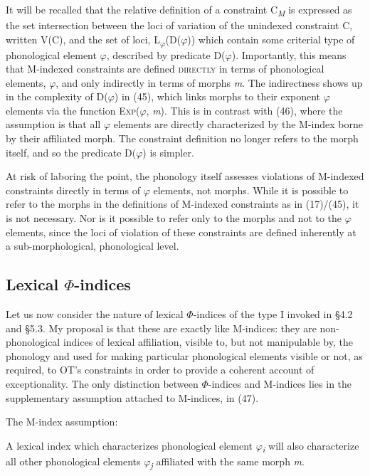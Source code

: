 \documentclass[output=paper,
modfonts
]{LSP/langsci}
\begin{document}
It will be recalled that the relative definition of a constraint C\textit{\textsubscript{M}} is expressed as the set intersection between the loci of variation of the unindexed constraint C, written V(C), and the set of loci, L\textsubscript{$\varphi $}(D($\varphi $)) which contain some criterial type of phonological element $\varphi $, described by predicate D($\varphi $). Importantly, this means that M-indexed constraints are defined \textsc{directly} in terms of phonological elements, $\varphi $, and only indirectly in terms of morphs \textit{m}. The indirectness shows up in the complexity of D($\varphi $) in (45), which links morphs to their exponent $\varphi $ elements via the function \textsc{Exp}($\varphi $, \textit{m}). This is in contrast with (46), where the assumption is that all $\varphi $ elements are directly characterized by the M-index borne by their affiliated morph. The constraint definition no longer refers to the morph itself, and so the predicate D($\varphi $) is simpler. 

At risk of laboring the point, the phonology itself assesses violations of M-indexed constraints directly in terms of $\varphi $ elements, not morphs. While it is possible to refer to the morphs in the definitions of M-indexed constraints as in (17)/(45), it is not necessary. Nor is it possible to refer only to the morphs and not to the $\varphi $ elements, since the loci of violation of these constraints are defined inherently at a sub-morphological, phonological level.

\subsection[Lexical $\Phi ${}-indices]{Lexical $\Phi $-indices}
\label{bkm:Ref335561253}
Let us now consider the nature of lexical $\Phi $-indices of the type I invoked in §4.2 and §5.3. My proposal is that these are exactly like M-indices: they are non-phonological indices of lexical affiliation, visible to, but not manipulable by, the phonology and used for making particular phonological elements visible or not, as required, to OT's constraints in order to provide a coherent account of exceptionality. The only distinction between $\Phi $-indices and M-indices lies in the supplementary assumption attached to M-indices, in (47).

\ea The M-index assumption:

A lexical index which characterizes phonological element $\varphi $\textit{\textsubscript{i}} will also characterize all other phonological elements $\varphi $\textit{\textsubscript{j}} affiliated with the same morph \textit{m}.
\z
\end{document}

